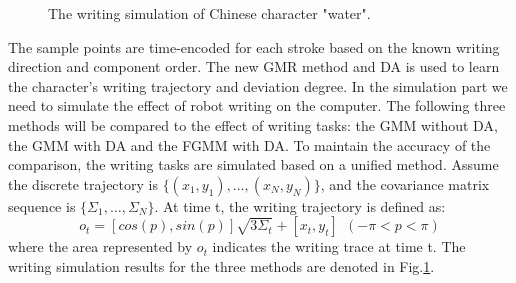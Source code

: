 \documentclass[conference]{IEEEtran}
\begin{document}
\begin{figure}[!t]
{    }
    \caption{The writing simulation of Chinese character "water".}
    \label{fig5}
\end{figure}

The sample points are time-encoded for each stroke based on the known writing direction and component order. The new GMR method and DA is used to learn the character's writing trajectory and deviation degree. In the simulation part we need to simulate the effect of robot writing on the computer. The following three methods will be compared to the effect of writing tasks: the GMM without DA, the GMM with DA and the FGMM with DA. To maintain the accuracy of the comparison, the writing tasks are simulated based on a unified method. Assume the discrete trajectory is $\{(x_1,y_1),\hdots,(x_N,y_N)\}$, and the covariance matrix sequence is $\{\Sigma_1,\hdots,\Sigma_N\}$. At time t, the writing trajectory is defined as:
\begin{equation}
    o_t =[cos(p),sin(p)]\sqrt{3\Sigma_t}+[x_t,y_t]~~(-\pi<p<\pi)
\end{equation}
where the area represented by $o_t$ indicates the writing trace at time t. The writing simulation results for the three methods are denoted in Fig.\ref{fig5}. 
\end{document}

